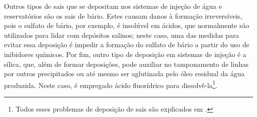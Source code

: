 Outros tipos de sais que se depositam nos sistemas de inje\c{c}\~{a}o de \'{a}gua e reservat\'{o}rios s\~{a}o os sais de b\'{a}rio. Estes causam danos \`{a} forma\c{c}\~{a}o irrevers\'{i}veis, pois o sulfato de b\'{a}rio, por exemplo, \'{e} insol\'{u}vel em \'{a}cidos, que normalmente s\~{a}o utilizados para lidar com dep\'{o}sitos salinos; neste caso, uma das medidas para evitar essa deposi\c{c}\~{a}o \'{e} impedir a forma\c{c}\~{a}o do sulfato de b\'{a}rio a partir do uso de inibidores qu\'{i}micos. Por fim, outro tipo de deposi\c{c}\~{a}o em sistemas de inje\c{c}\~{a}o \'{e} a s\'{i}lica, que, al\'{e}m de formar deposi\c{c}\~{o}es, pode auxiliar no tamponamento de linhas por outros precipitados ou at\'{e} mesmo ser aglutinada pelo \'{o}leo residual da \'{a}gua produzida. Neste caso, \'{e} empregado \'{a}cido fluor\'{i}drico para dissolv\^{e}-la\footnote{Todos esses problemas de deposi\c{c}\~{a}o de sais s\~{a}o explicados em \cite[p. 664]{engres}.}.